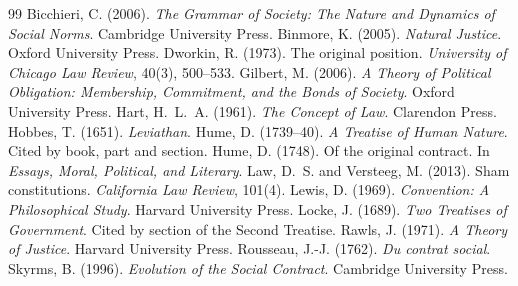 \documentclass{situationist-preprint}
\begin{document}
\begin{thebibliography}{99}\small
{} Bicchieri, C. (2006). \emph{The Grammar of Society: The Nature and Dynamics of Social Norms}. Cambridge University Press.
 Binmore, K. (2005). \emph{Natural Justice}. Oxford University Press.
 Dworkin, R. (1973). The original position. \emph{University of Chicago Law Review}, 40(3), 500--533.
 Gilbert, M. (2006). \emph{A Theory of Political Obligation: Membership, Commitment, and the Bonds of Society}. Oxford University Press.
 Hart, H.~L.~A. (1961). \emph{The Concept of Law}. Clarendon Press.
 Hobbes, T. (1651). \emph{Leviathan}.
 Hume, D. (1739--40). \emph{A Treatise of Human Nature}. Cited by book, part and section.
 Hume, D. (1748). Of the original contract. In \emph{Essays, Moral, Political, and Literary}.
 Law, D.~S. and Versteeg, M. (2013). Sham constitutions. \emph{California Law Review}, 101(4).
 Lewis, D. (1969). \emph{Convention: A Philosophical Study}. Harvard University Press.
 Locke, J. (1689). \emph{Two Treatises of Government}. Cited by section of the Second Treatise.
 Rawls, J. (1971). \emph{A Theory of Justice}. Harvard University Press.
 Rousseau, J.-J. (1762). \emph{Du contrat social}.
 Skyrms, B. (1996). \emph{Evolution of the Social Contract}. Cambridge University Press.
\end{thebibliography}
\end{document}
